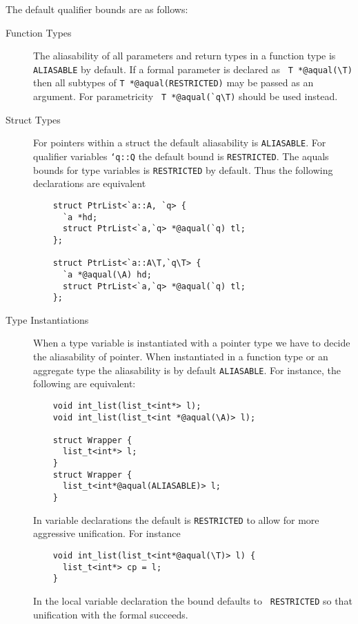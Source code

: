 The default qualifier bounds are as follows:

\begin{description}
\item[Function Types] The aliasability of all parameters and return
  types in a function type is {\tt ALIASABLE} by default. If a formal
  parameter is declared as \verb+ T *@aqual(\T)+ then all subtypes of
  {\tt T *@aqual(RESTRICTED)} may be passed as an argument. For
  parametricity \verb+ T *@aqual(`q\T)+ should be used instead.

\item[Struct Types] For pointers within a struct the default
  aliasability is {\tt ALIASABLE}. For qualifier variables {\tt `q::Q}
  the default bound is {\tt RESTRICTED}. The aquals bounds for type
  variables is {\tt RESTRICTED} by default. Thus the following
  declarations are equivalent

  \begin{verbatim}
    struct PtrList<`a::A, `q> {
      `a *hd; 
      struct PtrList<`a,`q> *@aqual(`q) tl;
    };

    struct PtrList<`a::A\T,`q\T> { 
      `a *@aqual(\A) hd; 
      struct PtrList<`a,`q> *@aqual(`q) tl;
    };
  \end{verbatim}
  
\item[Type Instantiations] When a type variable is instantiated with a
  pointer type we have to decide the aliasability of pointer. When
  instantiated in a function type or an aggregate type the
  aliasability is by default {\tt ALIASABLE}. For instance, the
  following are equivalent:
  
  \begin{verbatim}
    void int_list(list_t<int*> l);
    void int_list(list_t<int *@aqual(\A)> l);

    struct Wrapper {
      list_t<int*> l;
    }
    struct Wrapper {
      list_t<int*@aqual(ALIASABLE)> l;
    }
  \end{verbatim}

  In variable declarations the default is {\tt RESTRICTED} to allow
  for more aggressive unification. For instance

  \begin{verbatim} 
    void int_list(list_t<int*@aqual(\T)> l) {
      list_t<int*> cp = l;
    }
  \end{verbatim}
  
  In the local variable declaration the bound defaults to {\tt
  RESTRICTED} so that unification with the formal succeeds.

\end{description}

